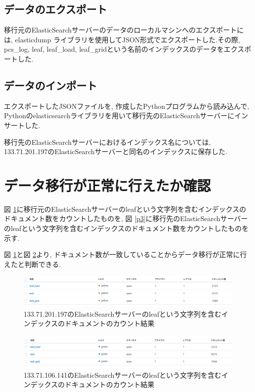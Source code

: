 \subsection{データのエクスポート}
移行元のElasticSearchサーバーのデータのローカルマシンへのエクスポートには, elasticdump \cite{1}ライブラリを使用してJSON形式でエクスポートした.その際, pcs\_log, leaf, leaf\_load, leaf\_gridという名前のインデックスのデータをエクスポートした.

\subsection{データのインポート}
エクスポートしたJSONファイルを, 作成したPythonプログラムから読み込んで, Pythonのelasticsearchライブラリを用いて移行先のElasticSearchサーバーにインサートした.

移行先のElasticSearchサーバーにおけるインデックス名については, 133.71.201.197のElasticSearchサーバーと同名のインデックスに保存した.

\section{データ移行が正常に行えたか確認}
図 \ref{p16}に移行元のElasticSearchサーバーのleafという文字列を含むインデックスのドキュメント数をカウントしたものを, 図 \ref{p3}に移行先のElasticSearchサーバーのleafという文字列を含むインデックスのドキュメント数をカウントしたものを示す.

図 \ref{p16}と図 \ref{p17}より, ドキュメント数が一致していることからデータ移行が正常に行えたと判断できる.

\begin{figure}[!ht]
    \begin{center}
        \includegraphics[width=160mm]{sotu/figure/197leaf.png}
        \caption{133.71.201.197のElasticSearchサーバーのleafという文字列を含むインデックスのドキュメントのカウント結果}
        \label{p16}
    \end{center}
\end{figure}

\begin{figure}[!ht]
    \begin{center}
        \includegraphics[width=160mm]{sotu/figure/141leaf.png}
        \caption{133.71.106.141のElasticSearchサーバーのleafという文字列を含むインデックスのドキュメントのカウント結果}
        \label{p17}
    \end{center}
\end{figure}

